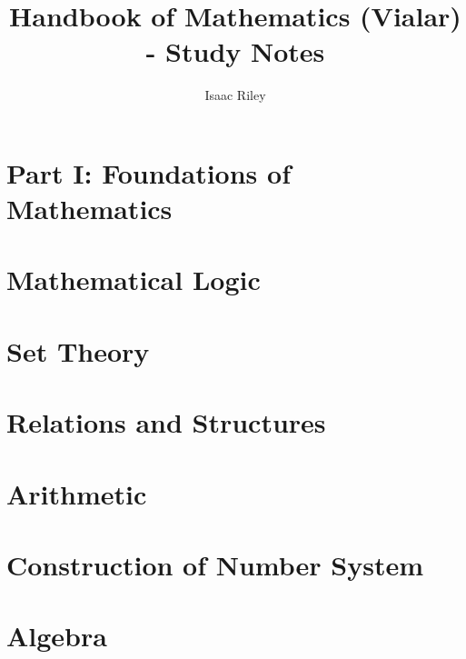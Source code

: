 \documentclass[a4paper]{article}
\title{Handbook of Mathematics (Vialar) - Study Notes}
\author{Isaac Riley}
\begin{document}
\maketitle
\tableofcontents
\newpage

\section*{Part I: Foundations of Mathematics}

\section{Mathematical Logic}

\subsection{}

\subsubsection{}


\section{Set Theory}

\section{Relations and Structures}

\section{Arithmetic}

\section{Construction of Number System}

\section{Algebra}
\end{document}
